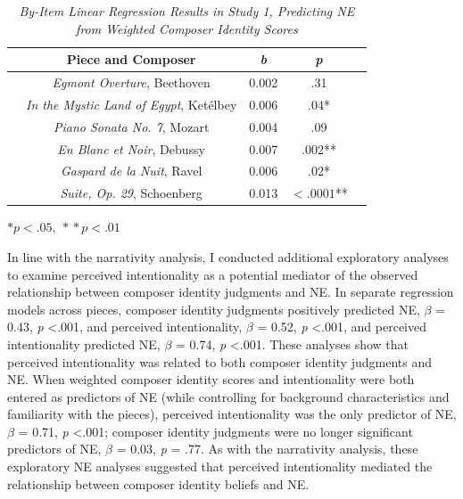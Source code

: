 \documentclass[12pt,twoside]{reedthesis}
\begin{document}
\begin{table}[h]
	\centering
	\caption {\emph{By-Item Linear Regression Results in Study 1, Predicting NE from Weighted Composer Identity Scores}} \label{table-CI-NE}
	\bigskip
	\begin{tabular}{c c c c c}
	\toprule
	& Piece and Composer & \emph{b} & \emph{p} &\\
	\hline
	& \emph{Egmont Overture}, Beethoven & 0.002 & .31 &\\
	\hline
	& \emph{In the Mystic Land of Egypt}, Ketélbey & 0.006 & .04* &\\
	\hline
	& \emph{Piano Sonata No. 7}, Mozart & 0.004 & .09 &\\ 
	\hline
	& \emph{En Blanc et Noir}, Debussy & 0.007 & .002** &\\
	\hline
	& \emph{Gaspard de la Nuit}, Ravel & 0.006 & .02* &\\
	\hline
	& \emph{Suite, Op. 29}, Schoenberg & 0.013 & $<.0001$** &\\
	\bottomrule
	\end{tabular}\par
	\bigskip
	\small\textit{}$*p < .05,  \:*\!*p < .01$
	\end{table}

In line with the narrativity analysis, I conducted additional exploratory analyses to examine perceived intentionality as a potential mediator of the observed relationship between composer identity judgments and NE. In separate regression models across pieces, composer identity judgments positively predicted NE, $\beta$ = 0.43, \emph{p} \textless .001, and perceived intentionality, $\beta$ = 0.52, \emph{p} \textless .001, and perceived intentionality predicted NE, $\beta$ = 0.74, \emph{p} \textless .001. These analyses show that perceived intentionality was related to both composer identity judgments and NE. When weighted composer identity scores and intentionality were both entered as predictors of NE (while controlling for background characteristics and familiarity with the pieces), perceived intentionality was the only predictor of NE, $\beta$ = 0.71, \emph{p} \textless .001; composer identity judgments were no longer significant predictors of NE, $\beta$ = 0.03, \emph{p} = .77. As with the narrativity analysis, these exploratory NE analyses suggested that perceived intentionality mediated the relationship between composer identity beliefs and NE.
\end{document}
